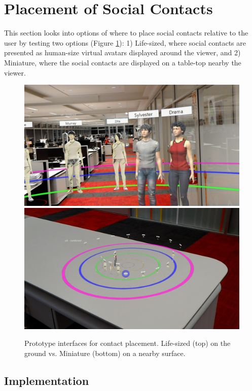 \pagebreak
\section{Placement of Social Contacts}
\label{sec:contacts:placing}

This section looks into options of where to place social contacts relative to the user \cite{Nassani2017a} by testing two options (Figure \ref{fig:continuum:conditions}): 1) Life-sized, where social contacts are presented as human-size virtual avatars displayed around the viewer, and 2) Miniature, where the social contacts are displayed on a table-top nearby the viewer. 

\begin{figure}[h]
    \centering
    \includegraphics[width=0.8\linewidth]{images/ismar17/20170625_205203_HoloLens.jpg}    \includegraphics[width=0.8\linewidth]{images/ismar17/20170625_205112_HoloLens.jpg}
    \caption{Prototype interfaces for contact placement. Life-sized (top) on the ground vs. Miniature (bottom) on a nearby surface.} 
    \label{fig:continuum:conditions}
\end{figure}

\subsection{Implementation}

